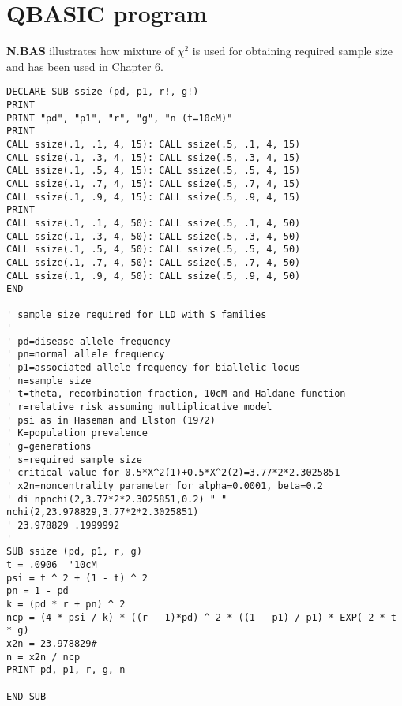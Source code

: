 \section{QBASIC program}
{\bf N.BAS} illustrates how mixture of $\chi^2$ is used for obtaining
required sample size and has been used in Chapter 6.
\begin{verbatim}
DECLARE SUB ssize (pd, p1, r!, g!)
PRINT
PRINT "pd", "p1", "r", "g", "n (t=10cM)"
PRINT
CALL ssize(.1, .1, 4, 15): CALL ssize(.5, .1, 4, 15)
CALL ssize(.1, .3, 4, 15): CALL ssize(.5, .3, 4, 15)
CALL ssize(.1, .5, 4, 15): CALL ssize(.5, .5, 4, 15)
CALL ssize(.1, .7, 4, 15): CALL ssize(.5, .7, 4, 15)
CALL ssize(.1, .9, 4, 15): CALL ssize(.5, .9, 4, 15)
PRINT
CALL ssize(.1, .1, 4, 50): CALL ssize(.5, .1, 4, 50)
CALL ssize(.1, .3, 4, 50): CALL ssize(.5, .3, 4, 50)
CALL ssize(.1, .5, 4, 50): CALL ssize(.5, .5, 4, 50)
CALL ssize(.1, .7, 4, 50): CALL ssize(.5, .7, 4, 50)
CALL ssize(.1, .9, 4, 50): CALL ssize(.5, .9, 4, 50)
END

' sample size required for LLD with S families
'
' pd=disease allele frequency
' pn=normal allele frequency
' p1=associated allele frequency for biallelic locus
' n=sample size
' t=theta, recombination fraction, 10cM and Haldane function
' r=relative risk assuming multiplicative model
' psi as in Haseman and Elston (1972)
' K=population prevalence
' g=generations
' s=required sample size
' critical value for 0.5*X^2(1)+0.5*X^2(2)=3.77*2*2.3025851
' x2n=noncentrality parameter for alpha=0.0001, beta=0.2
' di npnchi(2,3.77*2*2.3025851,0.2) " " nchi(2,23.978829,3.77*2*2.3025851)
' 23.978829 .1999992
'
SUB ssize (pd, p1, r, g)
t = .0906  '10cM
psi = t ^ 2 + (1 - t) ^ 2
pn = 1 - pd
k = (pd * r + pn) ^ 2
ncp = (4 * psi / k) * ((r - 1)*pd) ^ 2 * ((1 - p1) / p1) * EXP(-2 * t * g)
x2n = 23.978829#
n = x2n / ncp
PRINT pd, p1, r, g, n

END SUB
\end{verbatim}

%
%

